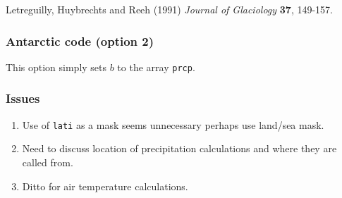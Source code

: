 Letreguilly, Huybrechts  and  Reeh (1991) \emph{Journal of
Glaciology} \textbf{37}, 149-157.

\subsubsection{Antarctic code (option 2)}
This option simply sets $b$ to the array \texttt{prcp}.

\subsubsection{Issues}
\begin{enumerate}
    \item Use of \texttt{lati} as a mask seems unnecessary perhaps
    use land/sea mask.
    \item Need to discuss location of precipitation calculations
    and where they are called from.
    \item Ditto for air temperature calculations.
\end{enumerate}
